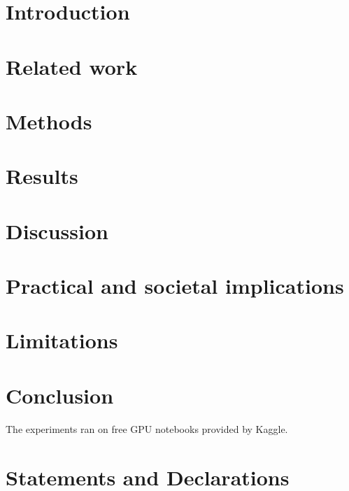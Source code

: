 \documentclass[pdflatex,sn-basic,iicol]{sn-jnl}
\theoremstyle{thmstyleone}
\theoremstyle{thmstyletwo}
\theoremstyle{thmstylethree}
\begin{document}
\maketitle

\section{Introduction}\label{sec:intro}


\section{Related work}\label{sec:related}


\section{Methods}\label{sec:methods}


\section{Results}\label{sec:results}


\section{Discussion}\label{sec:discussion}


\section{Practical and societal implications}\label{sec:implications}


\section{Limitations}\label{sec:limitations}


\section{Conclusion}\label{sec:conclusion}


\backmatter

The experiments ran on free GPU notebooks provided by Kaggle.

\section*{Statements and Declarations}
\end{document}

